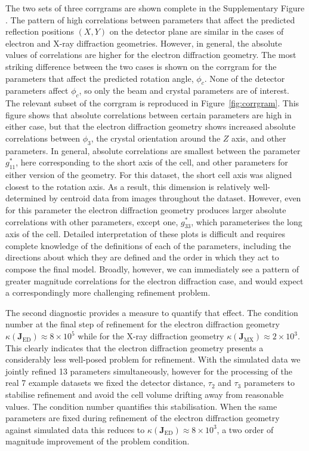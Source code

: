 \documentclass[preprint]{iucr}
\newcommand{\mat}[1]{\mathbf{#1}}
\newcounter{DWCounter}
\newcommand{\DW}[1]{%
   \stepcounter{DWCounter}%
   {\color{red}{\textbf{DW \#\arabic{DWCounter}: }#1}}%
  }
\begin{document}
The two sets of three corrgrams are shown complete in the Supplementary Figure
\DW{ref to suppl. mat.}. The pattern of high correlations between parameters
that affect the predicted reflection positions $(X, Y)$ on the detector plane
are similar in the cases of electron and X-ray diffraction geometries. However,
in general, the absolute values of correlations are higher for the electron
diffraction geometry. The most striking difference between the two cases is
shown on the corrgram for the parameters that affect the predicted rotation
angle, $\phi_c$. None of the detector parameters affect $\phi_c$, so only the
beam and crystal parameters are of interest. The relevant subset of the
corrgram is reproduced in Figure~\ref{fig:corrgram}. This figure shows that
absolute correlations between certain parameters are high in either case, but
that the electron diffraction geometry shows increased absolute correlations
between $\phi_3$, the crystal orientation around the $Z$ axis, and other
parameters. In general, absolute correlations are smallest between the
parameter $g^*_{11}$, here corresponding to the short axis of the cell, and
other parameters for either version of the geometry. For this dataset, the
short cell axis was aligned closest to the rotation axis. As a result, this
dimension is relatively well-determined by centroid data from images throughout
the dataset. However, even for this parameter the electron diffraction geometry
produces larger absolute correlations with other parameters, except one,
$g^*_{33}$, which parameterises the long axis of the cell. Detailed
interpretation of these plots is difficult and requires complete knowledge of
the definitions of each of the parameters, including the directions about which
they are defined and the order in which they act to compose the final model.
Broadly, however, we can immediately see a pattern of greater magnitude
correlations for the electron diffraction case, and would expect a
correspondingly more challenging refinement problem.

The second diagnostic provides a measure to quantify that effect. The condition
number at the final step of refinement for the electron diffraction geometry
$\kappa \left( \mat{J}_{\textrm{ED}} \right) \approx 8 \times 10^5$ while for
the X-ray diffraction geometry $\kappa \left( \mat{J}_{\textrm{MX}} \right)
\approx 2 \times 10^3$. This clearly indicates that the electron diffraction
geometry presents a considerably less well-posed problem for refinement. With
the simulated data we jointly refined 13 parameters simultaneously, however for
the processing of the real 7 example datasets we fixed the detector distance,
$\tau_2$ and $\tau_3$ parameters to stabilise refinement and avoid the cell
volume drifting away from reasonable values. The condition number quantifies
this stabilisation. When the same parameters are fixed during refinement of the
electron diffraction geometry against simulated data this reduces to $\kappa
\left( \mat{J}_{\textrm{ED}} \right) \approx 8 \times 10^3$, a two order of
magnitude improvement of the problem condition.
\end{document}

